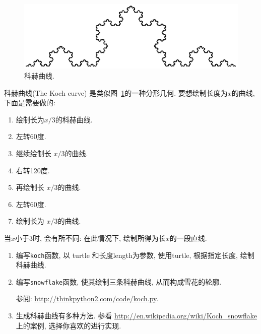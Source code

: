 \documentclass[10pt]{book}
\begin{document}
\begin{figure}
\centerline
{\includegraphics[scale=0.8]{figs/koch.pdf}}
\caption{科赫曲线.}
\label{fig.koch}
\end{figure}

\begin{exercise}

科赫曲线(The Koch curve) 是类似图~\ref{fig.koch}的一种分形几何. 
要想绘制长度为$x$的曲线, 下面是需要做的:

\begin{enumerate}

\item 绘制长为$x/3$的科赫曲线. 

\item 左转60度. 

\item 继续绘制长 $x/3$的曲线. 

\item 右转120度. 

\item 再绘制长 $x/3$的曲线. 

\item 左转60度. 

\item 绘制长为 $x/3$的曲线. 

\end{enumerate}

当$x$小于3时, 会有所不同:  在此情况下, 绘制所得为长$x$的一段直线. 

\begin{enumerate}

\item 编写{\tt koch}函数, 以 turtle 和长度length为参数, 使用turtle, 根据指定长度, 绘制
科赫曲线. 

\item 编写{\tt snowflake}函数, 使其绘制三条科赫曲线, 
从而构成雪花的轮廓.

参阅: \url{http://thinkpython2.com/code/koch.py}.

\item 生成科赫曲线有多种方法. 参看
\url{http://en.wikipedia.org/wiki/Koch_snowflake} 上的案例, 选择你喜欢的进行实现. 


\end{enumerate}
\end{exercise}
\end{document}
